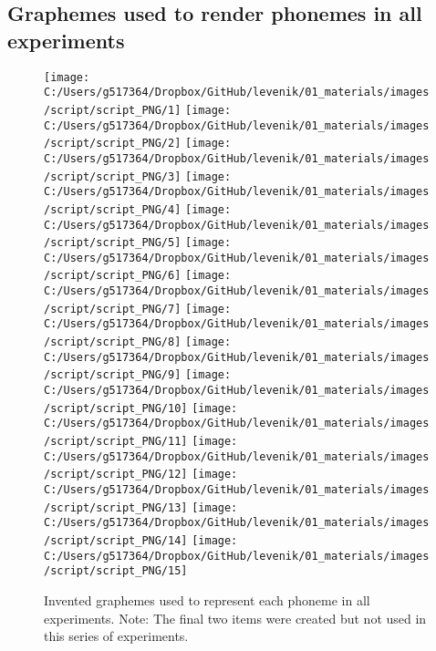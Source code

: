 \documentclass[doc,floatsintext]{apa6}
\begin{document}
\endgroup

\clearpage



\begin{appendix}
\section{}
\subsection{Graphemes used to render phonemes in all
experiments}\label{appendix-a}

\begin{figure}[htb]

{\centering \texttt{[image: C:/Users/g517364/Dropbox/GitHub/levenik/01\_materials/images/script/script\_PNG/1]} \texttt{[image: C:/Users/g517364/Dropbox/GitHub/levenik/01\_materials/images/script/script\_PNG/2]} \texttt{[image: C:/Users/g517364/Dropbox/GitHub/levenik/01\_materials/images/script/script\_PNG/3]} \texttt{[image: C:/Users/g517364/Dropbox/GitHub/levenik/01\_materials/images/script/script\_PNG/4]} \texttt{[image: C:/Users/g517364/Dropbox/GitHub/levenik/01\_materials/images/script/script\_PNG/5]} \texttt{[image: C:/Users/g517364/Dropbox/GitHub/levenik/01\_materials/images/script/script\_PNG/6]} \texttt{[image: C:/Users/g517364/Dropbox/GitHub/levenik/01\_materials/images/script/script\_PNG/7]} \texttt{[image: C:/Users/g517364/Dropbox/GitHub/levenik/01\_materials/images/script/script\_PNG/8]} \texttt{[image: C:/Users/g517364/Dropbox/GitHub/levenik/01\_materials/images/script/script\_PNG/9]} \texttt{[image: C:/Users/g517364/Dropbox/GitHub/levenik/01\_materials/images/script/script\_PNG/10]} \texttt{[image: C:/Users/g517364/Dropbox/GitHub/levenik/01\_materials/images/script/script\_PNG/11]} \texttt{[image: C:/Users/g517364/Dropbox/GitHub/levenik/01\_materials/images/script/script\_PNG/12]} \texttt{[image: C:/Users/g517364/Dropbox/GitHub/levenik/01\_materials/images/script/script\_PNG/13]} \texttt{[image: C:/Users/g517364/Dropbox/GitHub/levenik/01\_materials/images/script/script\_PNG/14]} \texttt{[image: C:/Users/g517364/Dropbox/GitHub/levenik/01\_materials/images/script/script\_PNG/15]} 

}

\caption{Invented graphemes used to represent each phoneme in all experiments. Note: The final two items were created but not used in this series of experiments.}\label{fig:unnamed-chunk-11}
\end{figure}
\end{appendix}
\end{document}
